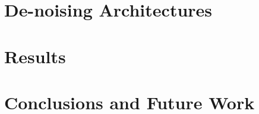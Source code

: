 \documentclass[12pt]{article}
\begin{document}
\section{De-noising Architectures}
\newpage


\section{Results}

\newpage


\section{Conclusions and Future Work}


\newpage

\nocite{*}
\fontsize{12pt}{16pt}\selectfont
{}

\end{document}
